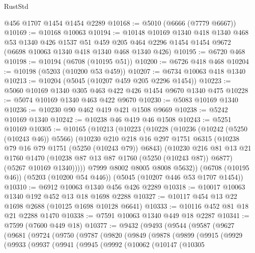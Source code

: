 \begin{lexlean}{RustStd}
\begin{coremodule}
    @456
    @1707
    @1454
    @1454
    @2289
@10168 := @5010 (@6666 (@7779 @6667))
@10169 := @10168 @10063
@10194 := @10148
    @10169
    @1340
    @418
    @1340
    @468
    @53
    @1340
    @426
    @1537
    @51
    @459
    @205
    @464
    @2296
    @1454
    @1454
    @9672
    (@6698 @10063 @1340 @418 @1340 @468 @1340 @426)
@10195 := @6720 @468
@10198 := @10194 (@6708 (@10195 @51))
@10200 := @6726 @418 @468
@10204 := @10198 (@5203 (@10200 @53 @459))
@10207 := @6734 @10063 @418 @1340
@10213 := @10204 (@5045 (@10207 @459 @205 @2296 @1454))
@10223 := @5060 @10169 @1340 @305 @463 @422 @426 @1454 @9670 @1340 @475
@10228 := @5074 @10169 @1340 @463 @422 @9670
@10230 := @5083 @10169 @1340
@10236 := @10230 @90 @462 @419 @421 @1508 @9669
@10238 := @5242 @10169 @1340
@10242 := @10238 @46 @419 @46 @1508
@10243 := @5251 @10169
@10305 := @10165
    (@10213
      (@10223
        (@10228
          (@10236
            (@10242 (@5250 (@10243 @46)) @5566)
            (@10230
              @210
              @218
              @16
              @297
              @1751
              @6315
              (@10238 @79 @16 @79 @1751 (@5250 (@10243 @79)) @6843)
              (@10230
                @216
                @81
                @13
                @21
                @1760
                @1470
                (@10238 @87 @13 @87 @1760 (@5250 (@10243 @87)) @6877)
                (@5267 @10169 @1340)))))
        @7999
        @8002
        @8005
        @8008
        @5632))
    (@6708 (@10195 @46))
    (@5203 (@10200 @54 @446))
    (@5045 (@10207 @446 @53 @1707 @1454))
@10310 := @6912 @10063 @1340 @456 @426 @2289
@10318 := @10017 @10063 @1340 @192 @452 @13 @18 @1698 @2288
@10327 := @10117 @454 @13 @22 @1698 @2688 (@10125 @1698 @10128 @6641)
@10333 := @10116 @452 @81 @18 @21 @2288 @1470
@10338 := @7591 @10063 @1340 @449 @18 @2287
@10341 := @7599 (@7600 @449 @18)
@10377 := @9432
    (@9493
      (@9544
        (@9587
          (@9627
            (@9681
              (@9724
                (@9750
                  (@9787
                    (@9820
                      (@9849
                        (@9878
                          (@9899
                            (@9915
                              (@9929
                                (@9933
                                  (@9937
                                    (@9941
                                      (@9945
                                        (@9992
                                          (@10062
                                            (@10147
                                              (@10305

\end{coremodule}
\end{lexlean}
